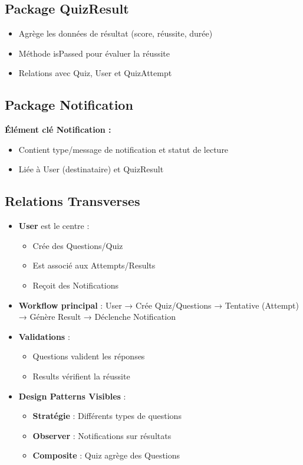 \documentclass[12pt,a4paper]{report}
\begin{document}
\subsection{Package QuizResult}

\begin{itemize}
\item Agrège les données de résultat (score, réussite, durée)
\item Méthode isPassed pour évaluer la réussite
\item Relations avec Quiz, User et QuizAttempt
\end{itemize}

\subsection{Package Notification}

\textbf{Élément clé Notification :}
\begin{itemize}
\item Contient type/message de notification et statut de lecture
\item Liée à User (destinataire) et QuizResult
\end{itemize}

\subsection{Relations Transverses}

\begin{itemize}
\item \textbf{User} est le centre :
  \begin{itemize}
  \item Crée des Questions/Quiz
  \item Est associé aux Attempts/Results
  \item Reçoit des Notifications
  \end{itemize}
\item \textbf{Workflow principal} : User → Crée Quiz/Questions → Tentative (Attempt) → Génère Result → Déclenche Notification
\item \textbf{Validations} :
  \begin{itemize}
  \item Questions valident les réponses
  \item Results vérifient la réussite
  \end{itemize}
\item \textbf{Design Patterns Visibles} :
  \begin{itemize}
  \item \textbf{Stratégie} : Différents types de questions
  \item \textbf{Observer} : Notifications sur résultats
  \item \textbf{Composite} : Quiz agrège des Questions
  \end{itemize}
\end{itemize}
\end{document}
